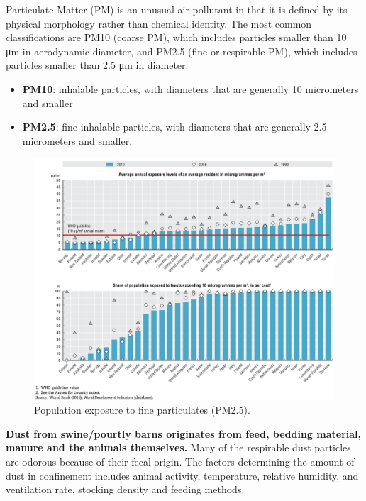 \documentclass[]{book}
\providecommand{\tightlist}{%
  \setlength{\itemsep}{0pt}\setlength{\parskip}{0pt}}
\begin{document}
Particulate Matter (PM) is an unusual air pollutant in that it is
defined by its physical morphology rather than chemical identity. The
most common classifications are PM10 (coarse PM), which includes
particles smaller than 10 μm in aerodynamic diameter, and PM2.5 (fine or
respirable PM), which includes particles smaller than 2.5 μm in
diameter.

\begin{itemize}
\tightlist
\item
  \textbf{PM10}: inhalable particles, with diameters that are generally
  10 micrometers and smaller
\item
  \textbf{PM2.5}: fine inhalable particles, with diameters that are
  generally 2.5 micrometers and smaller.
\end{itemize}

\begin{figure}

{\centering \includegraphics[width=1\linewidth]{figures/pm-oecd} 

}

\caption{Population exposure to fine particulates (PM2.5).}\label{fig:pm-oecd}
\end{figure}

\textbf{Dust from swine/pourtly barns originates from feed, bedding
material, manure and the animals themselves.} Many of the respirable
dust particles are odorous because of their fecal origin. The factors
determining the amount of dust in confinement includes animal activity,
temperature, relative humidity, and ventilation rate, stocking density
and feeding methods.
\end{document}
